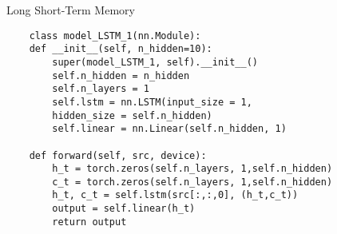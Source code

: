 Long Short-Term Memory
\begin{lstlisting}
    class model_LSTM_1(nn.Module):
    def __init__(self, n_hidden=10):
        super(model_LSTM_1, self).__init__()
        self.n_hidden = n_hidden
        self.n_layers = 1
        self.lstm = nn.LSTM(input_size = 1, 
        hidden_size = self.n_hidden)
        self.linear = nn.Linear(self.n_hidden, 1)

    def forward(self, src, device):
        h_t = torch.zeros(self.n_layers, 1,self.n_hidden)
        c_t = torch.zeros(self.n_layers, 1,self.n_hidden)
        h_t, c_t = self.lstm(src[:,:,0], (h_t,c_t))
        output = self.linear(h_t)
        return output
    \end{lstlisting}
